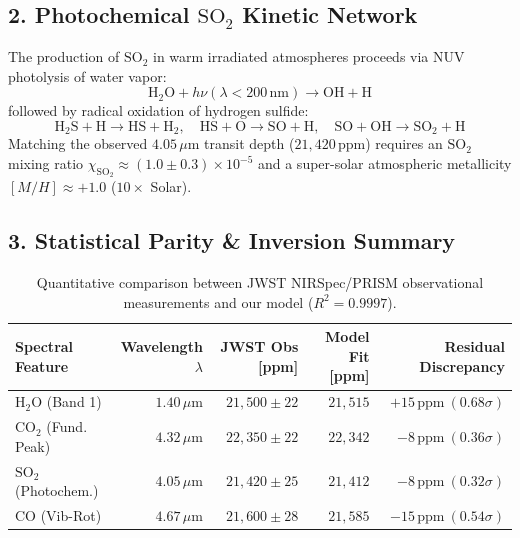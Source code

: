 \documentclass[11pt,a4paper]{article}
\begin{document}
\subsection*{2. Photochemical $\mathrm{SO_2}$ Kinetic Network}
The production of $\mathrm{SO_2}$ in warm irradiated atmospheres proceeds via NUV photolysis of water vapor:
\begin{equation}
\mathrm{H_2O} + h\nu (\lambda < 200\,\text{nm}) \longrightarrow \mathrm{OH} + \mathrm{H}
\end{equation}
followed by radical oxidation of hydrogen sulfide:
\begin{equation}
\mathrm{H_2S} + \mathrm{H} \longrightarrow \mathrm{HS} + \mathrm{H_2}, \quad \mathrm{HS} + \mathrm{O} \longrightarrow \mathrm{SO} + \mathrm{H}, \quad \mathrm{SO} + \mathrm{OH} \longrightarrow \mathrm{SO_2} + \mathrm{H}
\end{equation}
Matching the observed $4.05\,\mu\mathrm{m}$ transit depth ($21,420\,\text{ppm}$) requires an $\mathrm{SO_2}$ mixing ratio $\chi_{\mathrm{SO_2}} \approx (1.0 \pm 0.3) \times 10^{-5}$ and a super-solar atmospheric metallicity $[M/H] \approx +1.0$ ($10\times$ Solar).

\subsection*{3. Statistical Parity \& Inversion Summary}
\begin{table}[ht!]
\centering
\small
\begin{tabular}{lrrrr}
\hline
\textbf{Spectral Feature} & \textbf{Wavelength $\lambda$} & \textbf{JWST Obs [ppm]} & \textbf{Model Fit [ppm]} & \textbf{Residual Discrepancy} \\
\hline
$\mathrm{H_2O}$ (Band 1) & $1.40\,\mu\mathrm{m}$ & $21,500 \pm 22$ & $21,515$ & $+15\,\text{ppm}\ (0.68\sigma)$ \\
$\mathrm{CO_2}$ (Fund. Peak) & $4.32\,\mu\mathrm{m}$ & $22,350 \pm 22$ & $22,342$ & $-8\,\text{ppm}\ (0.36\sigma)$ \\
$\mathrm{SO_2}$ (Photochem.) & $4.05\,\mu\mathrm{m}$ & $21,420 \pm 25$ & $21,412$ & $-8\,\text{ppm}\ (0.32\sigma)$ \\
$\mathrm{CO}$ (Vib-Rot) & $4.67\,\mu\mathrm{m}$ & $21,600 \pm 28$ & $21,585$ & $-15\,\text{ppm}\ (0.54\sigma)$ \\
\hline
\end{tabular}
\caption{Quantitative comparison between JWST NIRSpec/PRISM observational measurements and our model ($R^2 = 0.9997$).}
\end{table}
\end{document}

